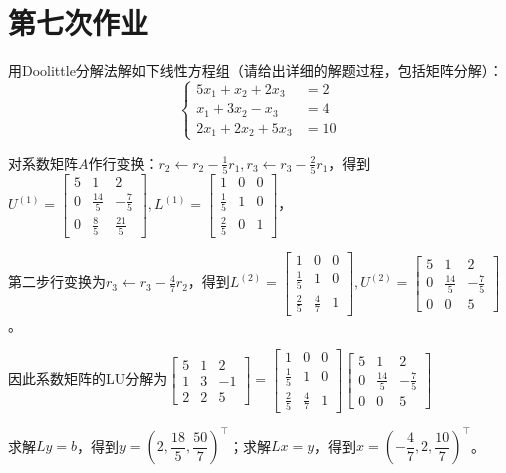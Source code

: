 \chapter{第七次作业}

    \begin{homework}[10pts]
        用Doolittle分解法解如下线性方程组（请给出详细的解题过程，包括矩阵分解）：
            \[\begin{cases}5x_1+x_2+2x_3&=2\\x_1+3x_2-x_3&=4\\2x_1+2x_2+5x_3&=10\end{cases}\]
    \end{homework}

    \begin{solution}
        对系数矩阵$A$作行变换：$r_2\leftarrow r_2-\frac15 r_1,r_3\leftarrow r_3-\frac25 r_1$，得到$U^{(1)}=\begin{bmatrix}5&1&2\\0&\tfrac{14}5&-\tfrac75\\0&\tfrac85&\tfrac{21}5\end{bmatrix},L^{(1)}=\begin{bmatrix}1&0&0\\\tfrac15&1&0\\\tfrac25&0&1\end{bmatrix}$，

        第二步行变换为$r_3\leftarrow r_3-\frac47 r_2$，得到$L^{(2)}=\begin{bmatrix}1&0&0\\\tfrac15&1&0\\\tfrac25&\tfrac47 &1\end{bmatrix}, U^{(2)}=\begin{bmatrix}5&1&2\\0&\tfrac{14}5&-\tfrac75\\0&0&5\end{bmatrix}$。

        因此系数矩阵的LU分解为$\begin{bmatrix}5&1&2\\1&3&-1\\2&2&5\end{bmatrix}=\begin{bmatrix}1&0&0\\\tfrac15&1&0\\\tfrac25&\tfrac47&1\end{bmatrix}\begin{bmatrix}5&1&2\\0&\tfrac{14}5&-\tfrac75\\0&0&5\end{bmatrix}$

        求解$Ly=b$，得到$y=\left(2,\dfrac{18}5,\dfrac{50}7\right)^{\top}$；求解$Lx=y$，得到$x=\left(-\dfrac47,2,\dfrac{10}7\right)^{\top}$。
    \end{solution}

